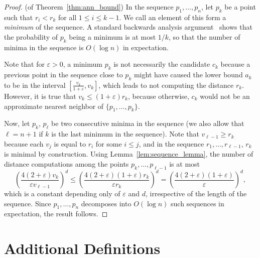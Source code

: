 \documentclass[]{ws-ijcga}
\renewcommand{\leq}{\leqslant}
\renewcommand{\geq}{\geqslant}
\newcommand{\eps}{\varepsilon}
\begin{document}
\begin{proof} (of Theorem~\ref{thm:ann_bound})
%
In the sequence $p_1,\ldots,p_n$, let $p_k$ be a point 
such that $r_i<r_k$ for all $1\leq i\leq k-1$. We call an element
of this form a \emph{minimum} of the sequence. 
A standard backwards analysis argument~\cite{seidel-backwards} shows that the probability
of $p_k$ being a minimum is at most $1/k$, so that the number of minima
in the sequence is $O(\log n)$ in expectation.

Note that for $\eps>0$,
a minimum $p_k$ is not necessarily the candidate $c_k$ because a previous point
in the sequence close to $p_k$ might have caused the lower bound $a_k$ to be
in the interval $[\frac{v_k}{1+\eps},v_k]$, which leads to not
computing the distance $r_k$. However, it is true that
$v_k\leq (1+\eps)r_k$, because otherwise, $c_k$ would not be an approximate
nearest neighbor of $\{p_1,\ldots,p_k\}$.

Now, let $p_k$, $p_\ell$ be two consecutive minima in the sequence
(we also allow that $\ell=n+1$ if $k$ is the last minimum in the sequence).
Note that $v_{\ell-1}\geq r_k$ because each $v_j$ is equal to $r_i$ for
some $i\leq j$, and in the sequence $r_1,\ldots,r_{\ell-1}$, $r_k$
is minimal by construction. Using Lemma~\ref{lem:sequence_lemma},
the number of distance computations among the points
$p_k,\ldots,p_{\ell-1}$ is at most
\[
\left(\frac{4(2+\eps) v_k}{\eps v_{\ell-1}}\right)^{d}\leq \left(\frac{4(2+\eps)(1+\eps)r_k}{\eps r_k}\right)^{d}=\left(\frac{4(2+\eps)(1+\eps)}{\eps}\right)^{d},\]
which is a constant depending only of $\eps$ and $d$, irrespective of the length of the sequence.
Since $p_1,\ldots,p_n$ decomposes into $O(\log n)$ such sequences in expectation, the result follows.
\end{proof}




\section{Additional Definitions}
\label{sec:appendix_background}
\end{document}
